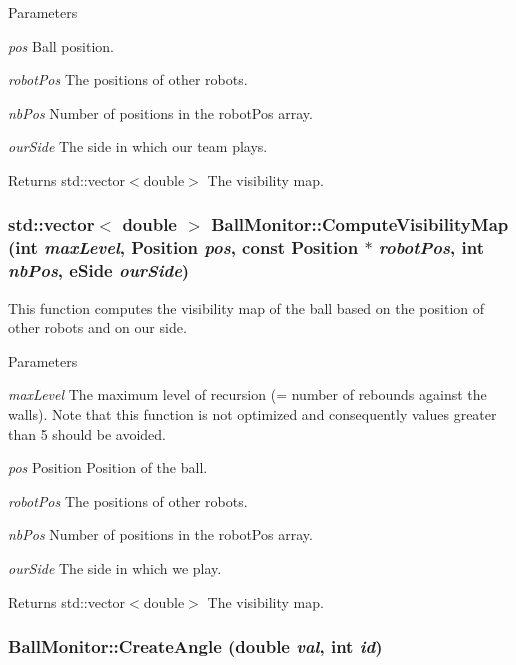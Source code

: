 \begin{DoxyParams}{Parameters}
\item[{\em pos}]Ball position. \item[{\em robotPos}]The positions of other robots. \item[{\em nbPos}]Number of positions in the robotPos array. \item[{\em ourSide}]The side in which our team plays. \end{DoxyParams}
\begin{DoxyReturn}{Returns}
std::vector$<$double$>$ The visibility map. 
\end{DoxyReturn}
\hypertarget{classBallMonitor_a0d2ef73ba2b0573021c800c311e08245}{
\subsubsection[{ComputeVisibilityMap}]{\setlength{\rightskip}{0pt plus 5cm}std::vector$<$ double $>$ BallMonitor::ComputeVisibilityMap (int {\em maxLevel}, \/  Position {\em pos}, \/  const Position $\ast$ {\em robotPos}, \/  int {\em nbPos}, \/  eSide {\em ourSide})}}
\label{classBallMonitor_a0d2ef73ba2b0573021c800c311e08245}


This function computes the visibility map of the ball based on the position of other robots and on our side. 


\begin{DoxyParams}{Parameters}
\item[{\em maxLevel}]The maximum level of recursion (= number of rebounds against the walls). Note that this function is not optimized and consequently values greater than 5 should be avoided. \item[{\em pos}]Position Position of the ball. \item[{\em robotPos}]The positions of other robots. \item[{\em nbPos}]Number of positions in the robotPos array. \item[{\em ourSide}]The side in which we play. \end{DoxyParams}
\begin{DoxyReturn}{Returns}
std::vector$<$double$>$ The visibility map. 
\end{DoxyReturn}
\hypertarget{classBallMonitor_a805b7229e7db773c56e9987d794ada9a}{
\subsubsection[{CreateAngle}]{ BallMonitor::CreateAngle (double {\em val}, \/  int {\em id})}}
\label{classBallMonitor_a805b7229e7db773c56e9987d794ada9a}



